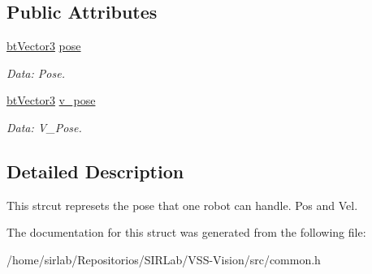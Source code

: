 \subsection*{Public Attributes}
\begin{DoxyCompactItemize}
\item 
\hypertarget{structcommon_1_1Robot_a31960c8ccd21cde1ca66e263851b83ad}{\hyperlink{structcommon_1_1btVector3}{bt\-Vector3} \hyperlink{structcommon_1_1Robot_a31960c8ccd21cde1ca66e263851b83ad}{pose}}\label{structcommon_1_1Robot_a31960c8ccd21cde1ca66e263851b83ad}

\begin{DoxyCompactList}\small\item\em Data\-: Pose. \end{DoxyCompactList}\item 
\hypertarget{structcommon_1_1Robot_a8114313ba162326a4cb51ce4d5c992f2}{\hyperlink{structcommon_1_1btVector3}{bt\-Vector3} \hyperlink{structcommon_1_1Robot_a8114313ba162326a4cb51ce4d5c992f2}{v\-\_\-pose}}\label{structcommon_1_1Robot_a8114313ba162326a4cb51ce4d5c992f2}

\begin{DoxyCompactList}\small\item\em Data\-: V\-\_\-\-Pose. \end{DoxyCompactList}\end{DoxyCompactItemize}


\subsection{Detailed Description}
This strcut represets the pose that one robot can handle. Pos and Vel. 

The documentation for this struct was generated from the following file\-:\begin{DoxyCompactItemize}
\item 
/home/sirlab/\-Repositorios/\-S\-I\-R\-Lab/\-V\-S\-S-\/\-Vision/src/common.\-h\end{DoxyCompactItemize}
